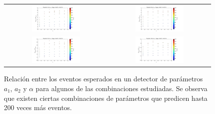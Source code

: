 	\begin{figure}[h!]
		\begin{center}
		\begin{tabular}{cc}
			\includegraphics[width=0.5\textwidth]{fig/resultadosRadio/CompRadioAuger_10_0_4_0_0_9_hc_modo1.pdf} &
			\includegraphics[width=0.5\textwidth]{fig/resultadosRadio/CompRadioAuger_25_0_4_0_0_9_hc_modo1.pdf} \\
			\includegraphics[width=0.5\textwidth]{fig/resultadosRadio/CompRadioAuger_75_0_4_0_0_9_hc_modo1.pdf} &
			\includegraphics[width=0.5\textwidth]{fig/resultadosRadio/CompRadioAuger_100_0_4_0_0_9_hc_modo1.pdf}
		\end{tabular}
			\caption{Relaci\'on entre los eventos esperados en un detector de par\'ametros $a_1$, $a_2$ y $\alpha$ para algunos de las combinaciones estudiadas. Se observa que existen ciertas combinaciones de par\'ametros que predicen hasta 200 veces m\'as eventos.}
			\label{fig:compRadioAuger}
		\end{center}
	\end{figure}
	
